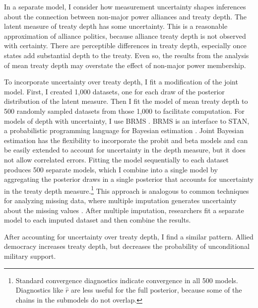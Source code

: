 \documentclass[12pt]{article}
\begin{document}
In a separate model, I consider how measurement uncertainty shapes inferences about the connection between non-major power alliances and treaty depth. 
The latent measure of treaty depth has some uncertainty. 
This is a reasonable approximation of alliance politics, because alliance treaty depth is not observed with certainty. 
There are perceptible differences in treaty depth, especially once states add substantial depth to the treaty. 
Even so, the results from the analysis of mean treaty depth may overstate the effect of non-major power membership. 


To incorporate uncertainty over treaty depth, I fit a modification of the joint model. 
First, I created 1,000 datasets, one for each draw of the posterior distribution of the latent measure.
Then I fit the model of mean treaty depth to 500 randomly sampled datasets from those 1,000 to facilitate computation. 
For models of depth with uncertainty, I use BRMS \citep{Buerkner2017}. 
BRMS is an interface to STAN, a probabilistic programming language for Bayesian estimation \citep{Carpenteretal2016}. 
Joint Bayesian estimation has the flexibility to incorporate the probit and beta models and can be easily extended to account for uncertainty in the depth measure, but it does not allow correlated errors. 
Fitting the model sequentially to each dataset produces 500 separate models, which I combine into a single model by aggregating the posterior draws in a single posterior that accounts for uncertainty in the treaty depth measure.\footnote{Standard convergence diagnostics indicate convergence in all 500 models. Diagnostics like $\hat{r}$ are less useful for the full posterior, because some of the chains in the submodels do not overlap.}
This approach is analogous to common techniques for analyzing missing data, where multiple imputation generates uncertainty about the missing values \citep{Hollenbachetal2018imp}.
After multiple imputation, researchers fit a separate model to each imputed dataset and then combine the results. 


After accounting for uncertainty over treaty depth, I find a similar pattern. 
Allied democracy increases treaty depth, but decreases the probability of unconditional military support. 


\singlespace
 
 
\end{document}
